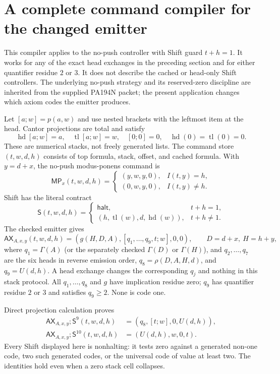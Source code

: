 \section{A complete command compiler for the changed emitter}
\label{sec:new-command-compiler}

This compiler applies to the no-push controller with Shift guard $t+h=1$.
It works for any of the exact head exchanges in the preceding section and
for either quantifier residue $2$ or $3$.  It does not describe the cached
or head-only Shift controllers.  The underlying no-push strategy and its
reserved-zero discipline are inherited from the supplied PA194N packet;
the present application changes which axiom codes the emitter produces.

Let $[a;w]=p(a,w)$ and use nested brackets with the leftmost item at the
head.  Cantor projections are total and satisfy
\[
 \operatorname{hd}[a;w]=a,\quad\operatorname{tl}[a;w]=w,
 \quad[0;0]=0,\quad\operatorname{hd}(0)=\operatorname{tl}(0)=0.
\]
These are numerical stacks, not freely generated lists.  The command store
$(t,w,d,h)$ consists of top formula, stack, offset, and cached formula.
With $y=d+x$, the no-push modus-ponens command is
\[
 \mathsf{MP}_x(t,w,d,h)=
 \begin{cases}(y,w,y,0),&I(t,y)=h,\\(0,w,y,0),&I(t,y)\ne h.\end{cases}   \tag{MP}
\]
Shift has the literal contract
\[
 \mathsf S(t,w,d,h)=
 \begin{cases}\mathsf{halt},&t+h=1,\\
 (h,\operatorname{tl}(w),d,\operatorname{hd}(w)),&t+h\ne1.
 \end{cases}                                                        \tag{S}
\]
The checked emitter gives
\[
 \mathsf{AX}_{A,x,y}(t,w,d,h)
   =(g(H,D,A),[q_1,\ldots,q_9,t;w],0,0),\qquad D=d+x,\ H=h+y,        \tag{AX}
\]
where $q_1=\Gamma(A)$ (or the separately checked $\Gamma(D)$ or
$\Gamma(H)$), and $q_2,\ldots,q_7$ are the six heads in reverse
emission order, $q_8=\rho(D,A,H,d)$, and $q_9=U(d,h)$.  A head exchange
changes the corresponding $q_j$ and nothing in this stack protocol.
All $q_1,\ldots,q_8$ and $g$ have implication residue zero; $q_9$ has
quantifier residue $2$ or $3$ and satisfies $q_9\ge2$.  None is code one.

Direct projection calculation proves
\begin{align*}
 \mathsf{AX}_{A,x,y};\mathsf S^9(t,w,d,h)
     &=(q_8,[t;w],0,U(d,h)),\\
 \mathsf{AX}_{A,x,y};\mathsf S^{10}(t,w,d,h)
     &=(U(d,h),w,0,t).                                  \tag{A10}
\end{align*}
Every Shift displayed here is nonhalting: it tests zero against a generated
non-one code, two such generated codes, or the universal code of value at
least two.  The identities hold even when a zero stack cell collapses.

